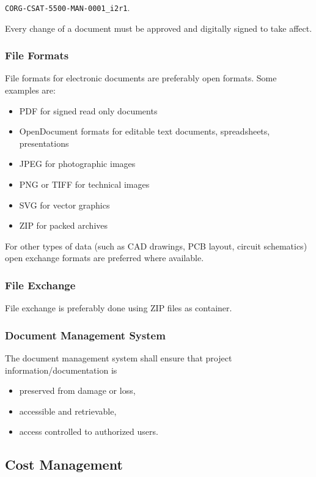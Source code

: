 \texttt{CORG-CSAT-5500-MAN-0001\_i2r1}.

Every change of a document must be approved and digitally signed to take affect.

\subsubsection{File Formats}

File formats for electronic documents are preferably open formats. Some examples are:

\begin{itemize}
\item PDF for signed read only documents
\item OpenDocument formats for editable text documents, spreadsheets, presentations
\item JPEG for photographic images
\item PNG or TIFF for technical images
\item SVG for vector graphics
\item ZIP for packed archives
\end{itemize}

For other types of data (such as CAD drawings, PCB layout, circuit schematics) open exchange formats are preferred where available.

\subsubsection{File Exchange}

File exchange is preferably done using ZIP files as container.

\subsubsection{Document Management System}

The document management system shall ensure that project information/documentation is

\begin{itemize}
\item preserved from damage or loss,
\item accessible and retrievable,
\item access controlled to authorized users.
\end{itemize}

\subsection{Cost Management}

